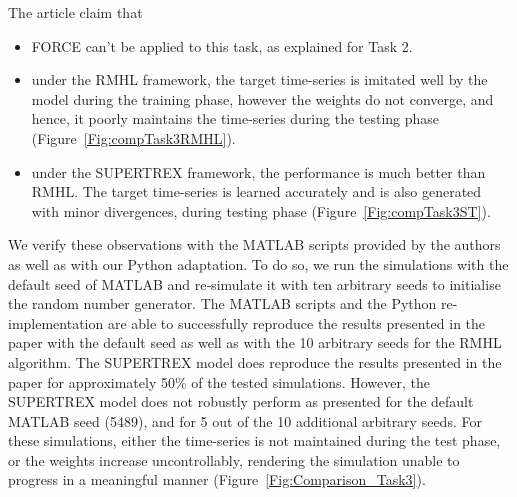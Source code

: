 The article claim that
\begin{itemize}
    \item FORCE can't be applied to this task, as explained for Task 2.
    \item under the RMHL framework, the target time-series is imitated well by the model during the training phase, however the weights do not converge, and hence, it poorly maintains the time-series during the testing phase (Figure~\ref{Fig:compTask3RMHL}).
    \item under the SUPERTREX framework, the performance is much better than RMHL. The target time-series is learned accurately and is also generated with minor divergences, during testing phase (Figure~\ref{Fig:compTask3ST}).
\end{itemize}

We verify these observations with the MATLAB scripts provided by the authors as well as with our Python adaptation. To do so, we run the simulations with the default seed of MATLAB and re‐simulate it with ten arbitrary seeds to initialise the random number generator. The MATLAB scripts and the Python re-implementation are able to successfully reproduce the results presented in the paper with the default seed as well as with the 10 arbitrary seeds for the RMHL algorithm. The SUPERTREX model does reproduce the results presented in the paper for approximately 50\% of the tested simulations. However, the SUPERTREX model does not robustly perform as presented for the default MATLAB seed (5489), and for 5 out of the 10 additional arbitrary seeds. For these simulations, either the time-series is not maintained during the test phase, or the weights increase uncontrollably, rendering the simulation unable to progress in a meaningful manner (Figure~\ref{Fig:Comparison_Task3}).



